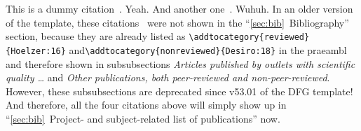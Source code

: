 \documentclass[ngerman]{scrartcl}
\begin{document}
This is a dummy citation~\cite{Hoelzer:17}. Yeah. And another one~\cite{Gerst:18}. Wuhuh. In an older version of the template, these citations~\cite{Hoelzer:16, Desiro:18} were not shown in the ``\ref{sec:bib}~Bibliography'' section, because they are already listed as \verb=\addtocategory{reviewed}{Hoelzer:16}= and\verb=\addtocategory{nonreviewed}{Desiro:18}= in the praeambl and therefore shown in subsubsections \emph{Articles published by outlets with scientific quality \dots} and \emph{Other publications, both peer-reviewed and non-peer-reviewed}. However, these subsubsections are deprecated since v53.01 of the DFG template! And therefore, all the four citations above will simply show up in ``\ref{sec:bib}~Project- and subject-related list of publications'' now.

\lipsum[1]



\end{document}
